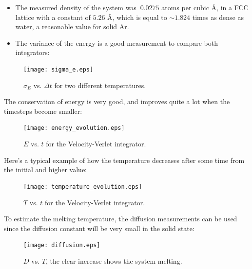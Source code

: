 \documentclass{beamer}
\begin{document}
		\begin{frame}{\secname}
			\begin{itemize}
				\item The measured density of the system was $~0.0275$ atoms per cubic \AA, in a FCC lattice with a constant of $5.26$ \AA, which is equal to $\sim1.824$ times as dense as water, a reasonable value for solid Ar.
		
				\item The variance of the energy is a good measurement to compare both integrators:
			\end{itemize}
				
			\begin{figure}[ht!]\begin{center}\texttt{[image: sigma\_e.eps]}\par\protect\caption{$\sigma_E$ vs. $\Delta t$ for two different temperatures.}\end{center}\end{figure}
		\end{frame}
		
		\begin{frame}{\secname}
			The conservation of energy is very good, and improves quite a lot when the timesteps become smaller:
			
			\begin{figure}[ht!]\begin{center}\texttt{[image: energy\_evolution.eps]}\par\protect\caption{$E$ vs. $t$ for the Velocity-Verlet integrator.}\end{center}\end{figure}
		\end{frame}
		
		\begin{frame}{\secname}
			Here's a typical example of how the temperature decreases after some time from the initial and higher value:
			
			\begin{figure}[ht!]\begin{center}\texttt{[image: temperature\_evolution.eps]}\par\protect\caption{$T$ vs. $t$ for the Velocity-Verlet integrator.}\end{center}\end{figure}
		\end{frame}
		
		\begin{frame}{\secname}
			To estimate the melting temperature, the diffusion measurements can be used since the diffusion constant will be very small in the solid state:
		
			\begin{figure}[ht!]\begin{center}\texttt{[image: diffusion.eps]}\par\protect\caption{$D$ vs. $T$, the clear increase shows the system melting.}\end{center}\end{figure}
		\end{frame}
		
\end{document}
